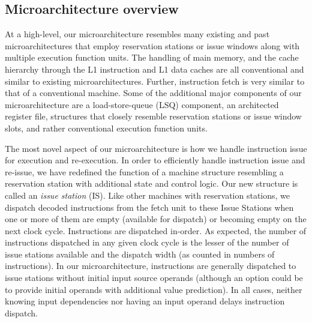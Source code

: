 \documentclass[10pt,dvips]{article}
\begin{document}
\subsection{Microarchitecture overview}
%
At a high-level, our microarchitecture resembles many existing
and past microarchitectures that employ reservation stations
or issue windows along with multiple execution function units.
The handling of main memory, and the cache hierarchy 
through the L1 instruction and L1 data caches are all
conventional and similar to existing microarchitectures.
Further, instruction fetch is very similar to that of a conventional
machine.
Some of the additional major components of our
microarchitecture are a
load-store-queue (LSQ) component, an architected register file,
structures that closely resemble reservation stations or issue
window slots, and rather conventional execution function units.

The most novel aspect of our microarchitecture is how we
handle instruction issue for execution and re-execution.
In order to efficiently handle instruction issue and re-issue,
we have redefined the function of a machine structure
resembling a reservation station with additional state and control
logic.  
Our new structure is called 
an \textit{issue station} (IS).
Like other machines with reservation stations, we dispatch 
decoded instructions from the fetch unit to these Issue Stations
when one or more of them are empty (available for dispatch) or 
becoming empty on the next clock cycle.  
Instructions are dispatched in-order.
As expected, the number of instructions dispatched in any 
given clock cycle is
the lesser of the number of issue stations available and the
dispatch width (as counted in numbers of instructions).
In our microarchitecture, instructions are generally
dispatched to issue stations without
initial input source operands (although an option could be
to provide initial operands with additional value prediction).
In all cases, neither knowing input dependencies nor having
an input operand delays instruction dispatch.
\end{document}

